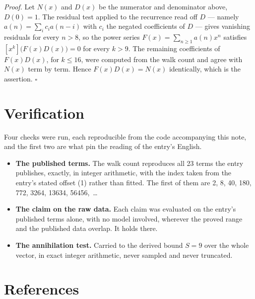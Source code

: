 \documentclass[11pt]{article}
\theoremstyle{definition}
\begin{document}
{\itshape Proof.} Let $N(x)$ and $D(x)$ be the numerator and denominator above, $D(0)=1$. The residual test applied to the recurrence read off $D$ --- namely $a(n) = \sum_i c_i a(n-i)$ with $c_i$ the negated coefficients of $D$ --- gives vanishing residuals for every $n > 8$, so the power series $F(x)=\sum_{n\ge 1}a(n)x^n$ satisfies $[x^k]\bigl(F(x)D(x)\bigr) = 0$ for every $k > 9$. The remaining coefficients of $F(x)D(x)$, for $k \le 16$, were computed from the walk count and agree with $N(x)$ term by term. Hence $F(x)D(x) = N(x)$ identically, which is the assertion. $\square$

\section{Verification}

Four checks were run, each reproducible from the code accompanying this note, and the first two are what pin the reading of the entry's English.

\begin{itemize}

\item {\bfseries The published terms.} The walk count reproduces all 23 terms the entry publishes, exactly, in integer arithmetic, with the index taken from the entry's stated offset (1) rather than fitted. The first of them are 2, 8, 40, 180, 772, 3264, 13634, 56456,~\dots

\item {\bfseries The claim on the raw data.} Each claim was evaluated on the entry's published terms alone, with no model involved, wherever the proved range and the published data overlap. It holds there.

\item {\bfseries The annihilation test.} Carried to the derived bound $S = 9$ over the whole vector, in exact integer arithmetic, never sampled and never truncated.

\end{itemize}

\section{References}
\end{document}
